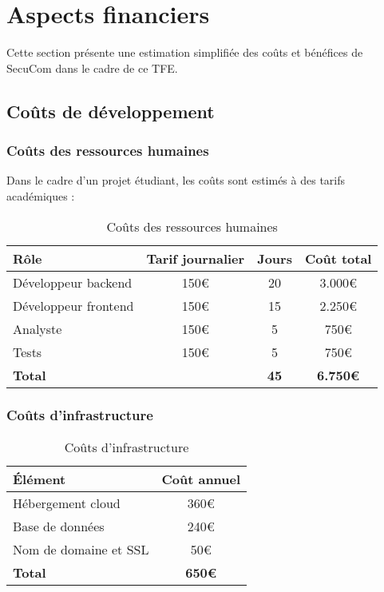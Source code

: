 \chapter{Aspects financiers}

Cette section présente une estimation simplifiée des coûts et bénéfices de SecuCom dans le cadre de ce TFE.

\section{Coûts de développement}

\subsection{Coûts des ressources humaines}

Dans le cadre d'un projet étudiant, les coûts sont estimés à des tarifs académiques :

\begin{table}[h]
\centering
\begin{tabular}{|l|c|c|c|}
\hline
\textbf{Rôle} & \textbf{Tarif journalier} & \textbf{Jours} & \textbf{Coût total} \\
\hline
Développeur backend & 150€ & 20 & 3.000€ \\
Développeur frontend & 150€ & 15 & 2.250€ \\
Analyste & 150€ & 5 & 750€ \\
Tests & 150€ & 5 & 750€ \\
\hline
\textbf{Total} & & \textbf{45} & \textbf{6.750€} \\
\hline
\end{tabular}
\caption{Coûts des ressources humaines}
\end{table}

\subsection{Coûts d'infrastructure}

\begin{table}[h]
\centering
\begin{tabular}{|l|c|}
\hline
\textbf{Élément} & \textbf{Coût annuel} \\
\hline
Hébergement cloud & 360€ \\
Base de données & 240€ \\
Nom de domaine et SSL & 50€ \\
\hline
\textbf{Total} & \textbf{650€} \\
\hline
\end{tabular}
\caption{Coûts d'infrastructure}
\end{table}


